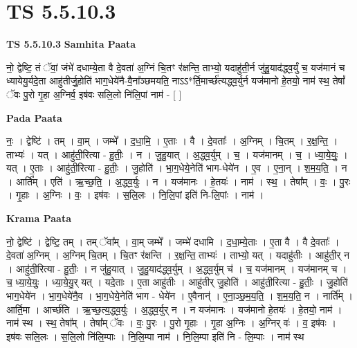 \documentclass[17pt]{extarticle}
\begin{document}
\section{ TS 5.5.10.3 }

\textbf{TS 5.5.10.3 } \newline
\textbf{Samhita Paata} \newline

नो॒ द्वेष्टि॒ तं ॅवां॒ जंभे॑ दधाम्ये॒ता वै दे॒वता॑ अ॒ग्निं चि॒तꣳ र॑क्षन्ति॒ ताभ्यो॒ यदाहु॑ती॒र्न जु॑हु॒याद॑द्ध्व॒र्युं च॒ यज॑मानं च ध्यायेयु॒र्यदे॒ता आहु॑तीर्जु॒होति॑ भाग॒धेये॑नै-वै॒ना᳚ञ्छमयति॒ नाऽऽ*र्ति॒मार्च्छ॑त्यद्ध्व॒र्युर्न यज॑मानो हे॒तयो॒ नाम॑ स्थ॒ तेषां᳚ ॅवः पु॒रो गृ॒हा अ॒ग्निर्व॒ इष॑वः सलि॒लो नि॑लि॒पां नाम॑ - [  ] \newline

\textbf{Pada Paata} \newline

नः॒ । द्वेष्टि॑ । तम् । वा॒म् । जम्भे᳚ । द॒धा॒मि॒ । ए॒ताः । वै । दे॒वताः᳚ । अ॒ग्निम् । चि॒तम् । र॒क्ष॒न्ति॒ । ताभ्यः॑ । यत् । आहु॑ती॒रित्या - हु॒तीः॒ । न । जु॒हु॒यात् । अ॒द्ध्व॒र्युम् । च॒ । यज॑मानम् । च॒ । ध्या॒ये॒युः॒ । यत् । ए॒ताः । आहु॑ती॒रित्या - हु॒तीः॒ । जु॒होति॑ । भा॒ग॒धेये॒नेति॑ भाग-धेये॑न । ए॒व । ए॒ना॒न् । श॒म॒य॒ति॒ । न । आर्ति᳚म् । एति॑ । ऋ॒च्छ॒ति॒ । अ॒द्ध्व॒र्युः । न । यज॑मानः । हे॒तयः॑ । नाम॑ । स्थ॒ । तेषा᳚म् । वः॒ । पु॒रः । गृ॒हाः । अ॒ग्निः । वः॒ । इष॑वः । स॒लि॒लः । नि॒लि॒पां इति॑ नि-लि॒पांः । नाम॑ ।  \newline


\textbf{Krama Paata} \newline

नो॒ द्वेष्टि॑ । द्वेष्टि॒ तम् । तम् ॅवा᳚म् । वा॒म् जम्भे᳚ । जम्भे॑ दधामि । द॒धा॒म्ये॒ताः । ए॒ता वै । वै दे॒वताः᳚ । दे॒वता॑ अ॒ग्निम् । अ॒ग्निम् चि॒तम् । चि॒तꣳ र॑क्षन्ति । र॒क्ष॒न्ति॒ ताभ्यः॑ । ताभ्यो॒ यत् । यदाहु॑तीः । आहु॑ती॒र् न । आहु॑ती॒रित्या - हु॒तीः॒ । न जु॑हु॒यात् । जु॒हु॒याद॑द्ध्व॒र्युम् । अ॒द्ध्व॒र्युम् च॑ । च॒ यज॑मानम् । यज॑मानम् च । च॒ ध्या॒ये॒युः॒ । ध्या॒ये॒यु॒र् यत् । यदे॒ताः । ए॒ता आहु॑तीः । आहु॑तीर् जु॒होति॑ । आहु॑ती॒रित्या - हु॒तीः॒ । जु॒होति॑ भाग॒धेये॑न । भा॒ग॒धेये॑नै॒व । भा॒ग॒धेये॒नेति॑ भाग - धेये॑न । ए॒वैनान्॑ । ए॒ना॒ञ्छ॒॒म॒य॒ति॒ । श॒म॒य॒ति॒ न । नार्ति᳚म् । आर्ति॒मा । आर्च्छ॑ति । ऋ॒च्छ॒त्य॒द्ध्व॒र्युः । अ॒द्ध्व॒र्युर् न । न यज॑मानः । यज॑मानो हे॒तयः॑ । हे॒तयो॒ नाम॑ । नाम॑ स्थ । स्थ॒ तेषा᳚म् । तेषा᳚म् ॅवः । वः॒ पु॒रः । पु॒रो गृ॒हाः । गृ॒हा अ॒ग्निः । अ॒ग्निर् वः॑ । व॒ इष॑वः । इष॑वः सलि॒लः । स॒लि॒लो नि॑लि॒म्पाः । नि॒लि॒म्पा नाम॑ । नि॒लि॒म्पा इति॑ नि - लि॒म्पाः । नाम॑ स्थ \newline
\end{document}

